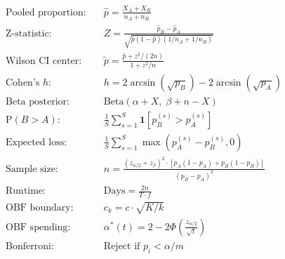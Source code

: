\documentclass[11pt,a4paper]{article}
\begin{document}
\begin{align}
\text{Pooled proportion:} \quad & \hat{p} = \frac{X_A + X_B}{n_A + n_B} \\[6pt]
\text{Z-statistic:} \quad & Z = \frac{\hat{p}_B - \hat{p}_A}{\sqrt{\hat{p}(1-\hat{p})(1/n_A + 1/n_B)}} \\[6pt]
\text{Wilson CI center:} \quad & \tilde{p} = \frac{\hat{p} + z^2/(2n)}{1 + z^2/n} \\[6pt]
\text{Cohen's } h: \quad & h = 2\arcsin\!\left(\sqrt{p_B}\right) - 2\arcsin\!\left(\sqrt{p_A}\right) \\[6pt]
\text{Beta posterior:} \quad & \mathrm{Beta}(\alpha + X, \;\beta + n - X) \\[6pt]
\text{P}(B > A): \quad & \frac{1}{S}\sum_{s=1}^S \mathbf{1}\!\left[p_B^{(s)} > p_A^{(s)}\right] \\[6pt]
\text{Expected loss:} \quad & \frac{1}{S}\sum_{s=1}^S \max\!\left(p_A^{(s)} - p_B^{(s)}, 0\right) \\[6pt]
\text{Sample size:} \quad & n = \frac{(z_{\alpha/2} + z_\beta)^2 \cdot [p_A(1{-}p_A) + p_B(1{-}p_B)]}{(p_B - p_A)^2} \\[6pt]
\text{Runtime:} \quad & \text{Days} = \frac{2n}{T \cdot f} \\[6pt]
\text{OBF boundary:} \quad & c_k = c \cdot \sqrt{K/k} \\[6pt]
\text{OBF spending:} \quad & \alpha^*(t) = 2 - 2\Phi\!\left(\frac{z_{\alpha/2}}{\sqrt{t}}\right) \\[6pt]
\text{Bonferroni:} \quad & \text{Reject if } p_i < \alpha / m
\end{align}
\end{document}

